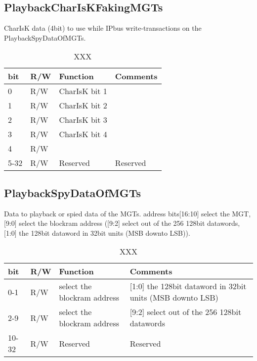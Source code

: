 \subsection{PlaybackCharIsKFakingMGTs}
CharIsK data (4bit) to use while IPbus write-transactions on the PlaybackSpyDataOfMGTs.
%
\begin {table}[H]
\begin{center}
\caption {XXX}
\label{reg_PlaybackSpyControl}
\begin{tabular}{|l|l|l|l|} 
\hline
\textbf{bit} & \textbf{R/W}  & \textbf{Function} & \textbf{Comments}\\
\hline
0& R/W & CharIsK bit 1 &  \\
\hline
1& R/W & CharIsK bit 2 &  \\
\hline
2& R/W &CharIsK bit 3  &  \\
\hline
3& R/W & CharIsK bit 4 &  \\
\hline
4& R/W & &  \\
\hline
5-32 & R/W & Reserved & Reserved \\
\hline
\end{tabular}
\end{center}
\end{table}


\subsection{PlaybackSpyDataOfMGTs}
Data to playback or spied data of the MGTs. address bits[16:10] select the MGT, [9:0] select the blockram address ([9:2] select out of the 256 128bit datawords, [1:0] the 128bit dataword in 32bit units (MSB downto LSB)).
%
\begin {table}[H]
\begin{center}
\caption {XXX}
\label{reg_PlaybackSpyControl}
\begin{tabular}{|l|l|l|l|} 
\hline
\textbf{bit} & \textbf{R/W}  & \textbf{Function} & \textbf{Comments}\\
\hline
0-1 & R/W & select the blockram address  & [1:0] the 128bit dataword in 32bit units (MSB downto LSB) \\
\hline
2-9 & R/W & select the blockram address & [9:2] select out of the 256 128bit datawords  \\
\hline
\hline
10-32 & R/W & Reserved & Reserved \\
\hline
\end{tabular}
\end{center}
\end{table}


